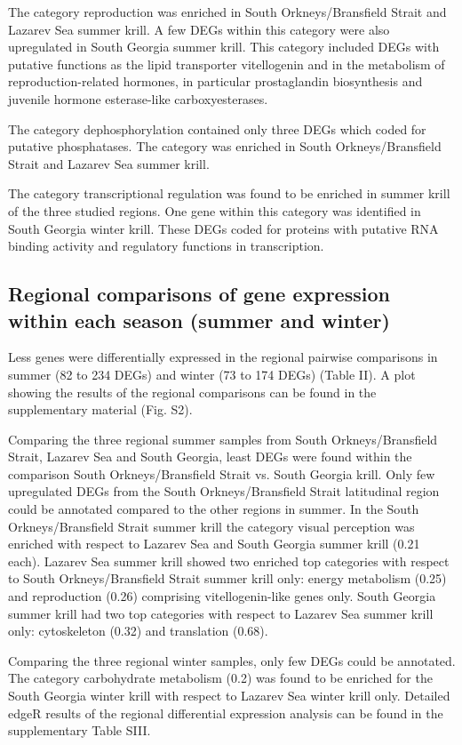 The category reproduction was enriched in South Orkneys/Bransfield Strait and Lazarev Sea summer krill. A few DEGs within this category were also upregulated in South Georgia summer krill. This category included DEGs with putative functions as the lipid transporter vitellogenin and in the metabolism of reproduction-related hormones, in particular prostaglandin biosynthesis and juvenile hormone esterase-like carboxyesterases.

The category dephosphorylation contained only three DEGs which coded for putative phosphatases. The category was enriched in South Orkneys/Bransfield Strait and Lazarev Sea summer krill.

The category transcriptional regulation was found to be enriched in summer krill of the three studied regions. One gene within this category was identified in South Georgia winter krill. These DEGs coded for proteins with putative RNA binding activity and regulatory functions in transcription.

\subsection*{Regional comparisons of gene expression within each season (summer and winter)}

Less genes were differentially expressed in the regional pairwise comparisons in summer (82 to 234 DEGs) and winter (73 to 174 DEGs) (Table II). A plot showing the results of the regional comparisons can be found in the supplementary material (Fig. S2).

Comparing the three regional summer samples from South Orkneys/Bransfield Strait, Lazarev Sea and South Georgia, least DEGs were found within the comparison South Orkneys/Bransfield Strait vs. South Georgia krill. Only few upregulated DEGs from the South Orkneys/Bransfield Strait latitudinal region could be annotated compared to the other regions in summer. In the South Orkneys/Bransfield Strait summer krill the category visual perception was enriched with respect to Lazarev Sea and South Georgia summer krill (0.21 each). Lazarev Sea summer krill showed two enriched top categories with respect to South Orkneys/Bransfield Strait summer krill only: energy metabolism (0.25) and reproduction (0.26) comprising vitellogenin-like genes only. South Georgia summer krill had two top categories with respect to Lazarev Sea summer krill only: cytoskeleton (0.32) and translation (0.68).

Comparing the three regional winter samples, only few DEGs could be annotated. The category  carbohydrate metabolism (0.2) was found to be enriched for the South Georgia winter krill with respect to Lazarev Sea winter krill only. 
Detailed edgeR results of the regional differential expression analysis can be found in the supplementary Table SIII.

